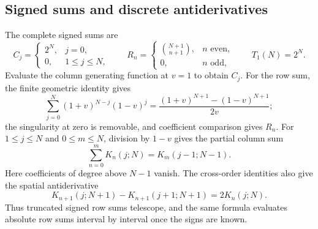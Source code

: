 \subsection{Signed sums and discrete antiderivatives}
The complete signed sums are
\begin{equation}\label{eq:sums-signed}
C_j=\begin{cases}2^N,&j=0,\\0,&1\le j\le N,\end{cases}
\qquad
R_n=\begin{cases}\binom{N+1}{n+1},&n\text{ even},\\0,&n\text{ odd},\end{cases}
\qquad T_1(N)=2^N.
\end{equation}
Evaluate the column generating function at $v=1$ to obtain $C_j$. For the row sum, the finite geometric identity gives
\[
\sum_{j=0}^N(1+v)^{N-j}(1-v)^j
=\frac{(1+v)^{N+1}-(1-v)^{N+1}}{2v};
\]
the singularity at zero is removable, and coefficient comparison gives $R_n$.
For $1\le j\le N$ and $0\le m\le N$, division by $1-v$ gives the partial column sum
\begin{equation}\label{eq:sums-partial-column}
\sum_{n=0}^m K_n(j;N)=K_m(j-1;N-1).
\end{equation}
Here coefficients of degree above $N-1$ vanish. The cross-order identities also give the spatial antiderivative
\begin{equation}\label{eq:sums-spatial-primitive}
K_{n+1}(j;N+1)-K_{n+1}(j+1;N+1)=2K_n(j;N).
\end{equation}
Thus truncated signed row sums telescope, and the same formula evaluates absolute row sums interval by interval once the signs are known.

